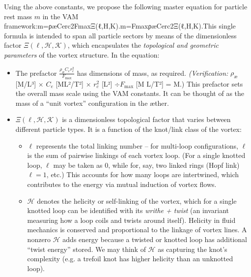 Using the above constants, we propose the following master equation for particle rest mass $m$ in the VAM framework:m=ρæCerc2Fmax⁡Ξ(ℓ,H,K).m=FmaxρæCerc2Ξ(ℓ,H,K).This single formula is intended to span all particle sectors by means of the dimensionless factor $\Xi(\ell,\mathcal{H},\mathcal{K})$, which encapsulates the \textit{topological and geometric parameters} of the vortex structure. In the equation:\begin{itemize}

\item
The prefactor $\displaystyle \frac{\rho_{\text{\ae}}C_e r_c^2}{F_{\max}}$ has dimensions of mass, as required. \textit{(Verification:} $\rho_{\text{\ae}}$ [M/L³] $\times$ $C_e$ [ML²/T²] $\times$ $r_c^2$ [L²] $\div F_{\max}$ [M L/T²] = M.) This prefactor sets the overall mass scale using the VAM constants. It can be thought of as the mass of a “unit vortex” configuration in the æther.

\item
$\Xi(\ell,\mathcal{H},\mathcal{K})$ is a dimensionless topological factor that varies between different particle types. It is a function of the knot/link class of the vortex:\begin{itemize}

\item
$\ell$ represents the total linking number – for multi-loop configurations, $\ell$ is the sum of pairwise linkings of each vortex loop. (For a single knotted loop, $\ell$ may be taken as 0, while for, say, two linked rings (Hopf link) $\ell=1$, etc.) This accounts for how many loops are intertwined, which contributes to the energy via mutual induction of vortex flows.

\item
$\mathcal{H}$ denotes the helicity or self-linking of the vortex, which for a single knotted loop can be identified with its \textit{writhe + twist} (an invariant measuring how a loop coils and twists around itself). Helicity in fluid mechanics is conserved and proportional to the linkage of vortex lines. A nonzero $\mathcal{H}$ adds energy because a twisted or knotted loop has additional “twist energy” stored. We may think of $\mathcal{H}$ as capturing the knot’s complexity (e.g. a trefoil knot has higher helicity than an unknotted loop).


\end{itemize}
\end{itemize}
